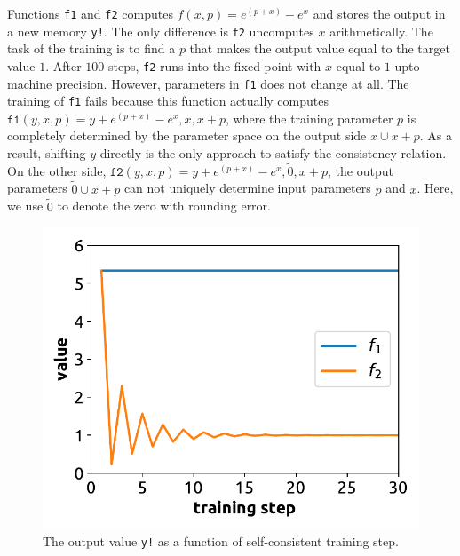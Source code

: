 \documentclass{article}
\newcommand{\<}{\langle}
\renewcommand{\>}{\rangle}
\theoremstyle{definition}\newtheorem{definition}{\textit{Definition}}
\begin{document}
Functions \texttt{f1} and \texttt{f2} computes $f(x, p) = e^{(p+x)} - e^x$ and stores the output in a new memory \texttt{y!}.
The only difference is \texttt{f2} uncomputes $x$ arithmetically.
The task of the training is to find a $p$ that makes the output value equal to the target value $1$.
After $100$ steps, \texttt{f2} runs into the fixed point with $x$ equal to $1$ upto machine precision.
However, parameters in \texttt{f1} does not change at all.
The training of \texttt{f1} fails because this function actually computes $\texttt{f1}(y, x, p) = y + e^{(p+x)} - e^{x}, x, x+p$, where the training parameter $p$ is completely determined by the parameter space on the output side $x \cup x+p$. As a result, shifting $y$ directly is the only approach to satisfy the consistency relation. On the other side, $\texttt{f2}(y, x, p) = y + e^{(p+x)} - e^x, \tilde{0}, x+p$, the output parameters $\tilde{0} \cup x+p$ can not uniquely determine input parameters $p$ and $x$. Here, we use $\tilde{0}$ to denote the zero with rounding error.

\begin{figure}
    \centerline{\includegraphics[width=0.6\columnwidth,trim={0 0.3cm 0 0},clip]{fig1.pdf}}
    \caption{The output value \texttt{y!} as a function of self-consistent training step.}\label{fig:invtrain}
\end{figure}
\end{document}
